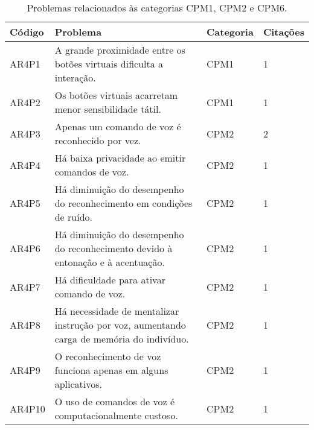 \begin{table}[htb]
  \begin{center}
    \ABNTEXfontereduzida
    \caption{Problemas relacionados às categorias CPM1, CPM2 e CPM6.}
    \label{tab-pro-1-2-6}
    \begin{tabular}{p{1.2cm}|p{10.0cm}|p{1.4cm}|p{1.4cm}}
      \textbf{Código} & \textbf{Problema}                                                                                & \textbf{Categoria} & \textbf{Citações} \\
      \hline
      AR4P1           & A grande proximidade entre os botões virtuais dificulta a interação.                             & CPM1               & 1                 \\
      \hline
      AR4P2           & Os botões virtuais acarretam menor sensibilidade tátil.                                          & CPM1               & 1                 \\
      \hline
      AR4P3           & Apenas um comando de voz é reconhecido por vez.                                                  & CPM2               & 2                 \\
      \hline
      AR4P4           & Há baixa privacidade ao emitir comandos de voz.                                                  & CPM2               & 1                 \\
      \hline
      AR4P5           & Há diminuição do desempenho do reconhecimento em condições de ruído.                             & CPM2               & 1                 \\
      \hline
      AR4P6           & Há diminuição do desempenho do reconhecimento devido à entonação e à acentuação.                 & CPM2               & 1                 \\
      \hline
      AR4P7           & Há dificuldade para ativar comando de voz.                                                       & CPM2               & 1                 \\
      \hline
      AR4P8           & Há necessidade de mentalizar instrução por voz, aumentando carga de memória do indivíduo.        & CPM2               & 1                 \\
      \hline
      AR4P9           & O reconhecimento de voz funciona apenas em alguns aplicativos.                                   & CPM2               & 1                 \\
      \hline
      AR4P10          & O uso de comandos de voz é computacionalmente custoso.                                           & CPM2               & 1                 \\

\end{tabular}
\end{center}
\end{table}
